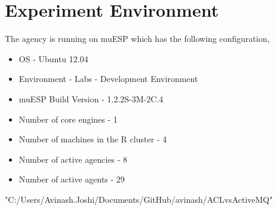 \documentclass{article}
\begin{document}
\section{Experiment Environment}
The agency is running on muESP which has the following configuration,
\begin{itemize}
\item OS - Ubuntu 12.04
\item Environment - Labs - Development Environment
\item muESP Build Version - 1.2.2S-3M-2C.4 
\item Number of core engines - 1
\item Number of machines in the R cluster - 4
\item Number of active agencies - 8
\item Number of active agents - 29
\end{itemize}

\begin{Schunk}
\begin{Soutput}
[1] "C:/Users/Avinash.Joshi/Documents/GitHub/avinash/ACLvsActiveMQ"
\end{Soutput}
\end{Schunk}
\end{document}
